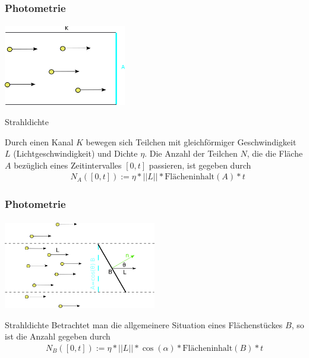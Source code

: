 \documentclass{beamer}
\begin{document}
\begin{frame}
    \frametitle{Photometrie}
\framesubtitle{}
\begin{center}
    \includegraphics[width=0.4\textwidth]{images/Partikelstrom.png}
\end{center}
\begin{block}{ Strahldichte}

Durch einen Kanal $K$ bewegen  sich Teilchen mit gleichförmiger Geschwindigkeit $L$ (Lichtgeschwindigkeit)  und  Dichte $\eta$.
Die Anzahl der Teilchen $N$, die die Fläche $A$ bezüglich eines Zeitintervalles $[0,t]$ passieren, ist gegeben durch
\begin{align}
& N_A([0,t]) := \eta * ||L||  *   \text{Flächeninhalt}(A) *   t 
\end{align}
\end{block}
\end{frame}

\begin{frame}
    \frametitle{Photometrie}
\framesubtitle{}

\begin{center}

    \includegraphics[width=0.5\textwidth]{images/Strahldichte.png}
\end{center}


\begin{block}{Strahldichte}
 Betrachtet man die allgemeinere Situation eines Flächenstückes $B$, so ist die Anzahl gegeben durch 
\begin{align}
N_B([0,t]) := \eta * ||L||  * \cos(\alpha) *  \text{Flächeninhalt} (B) * t
 \end{align}


\end{block}
\end{frame}
\end{document}
